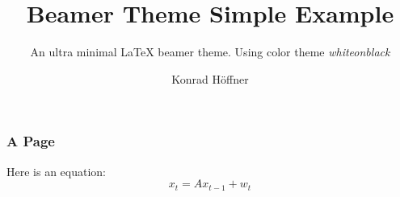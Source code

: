 \documentclass{beamer}
\title{Beamer Theme Simple Example}
\subtitle{An ultra minimal \LaTeX{} beamer theme. Using color theme \emph{whiteonblack}}
\author{Konrad Höffner}
\begin{document}
\begin{frame}
\titlepage
\end{frame}

\begin{frame}[fragile]
\frametitle{A Page}
Here is an equation:
\begin{equation}
x_t = Ax_{t-1} + w_t
\end{equation}
\end{frame}
\end{document}
